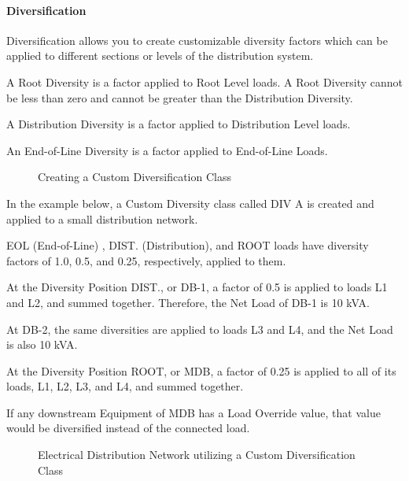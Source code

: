 \documentclass[letterpaper,10pt,english]{sphinxmanual}
\begin{document}
\paragraph{Diversification}
\label{\detokenize{docs/userguide/definingarchitecturalelements/archelements/index-arch-elements:diversification}}\label{\detokenize{docs/userguide/definingarchitecturalelements/archelements/index-arch-elements:id3}}
Diversification allows you to create customizable diversity factors which can be applied to different sections or levels of the distribution system.

A Root Diversity is a factor applied to Root Level loads.  A Root Diversity cannot be less than zero and cannot be greater than the Distribution Diversity.

A Distribution Diversity is a factor applied to Distribution Level loads.

An End-of-Line Diversity is a factor applied to End-of-Line Loads.

\begin{figure}[H]
\centering
\capstart

\noindent{}
\caption{Creating a Custom Diversification Class}\label{\detokenize{docs/userguide/definingarchitecturalelements/archelements/index-arch-elements:id9}}\end{figure}

In the example below, a Custom Diversity class called DIV A is created and applied to a small distribution network.

EOL (End-of-Line) , DIST. (Distribution), and ROOT loads have diversity factors of 1.0, 0.5, and 0.25, respectively, applied to them.

At the Diversity Position DIST., or DB-1, a factor of 0.5 is applied to loads L1 and L2, and summed together.  Therefore, the Net Load of DB-1 is 10 kVA.

At DB-2, the same diversities are applied to loads L3 and L4, and the Net Load is also 10 kVA.

At the Diversity Position ROOT, or MDB, a factor of 0.25 is applied to all of its loads, L1, L2, L3, and L4, and summed together.

If any downstream Equipment of MDB has a Load Override value, that value would be diversified instead of the connected load.

\begin{figure}[H]
\centering
\capstart

\noindent{}
\caption{Electrical Distribution Network utilizing a Custom Diversification Class}\label{\detokenize{docs/userguide/definingarchitecturalelements/archelements/index-arch-elements:id10}}\end{figure}
\end{document}
